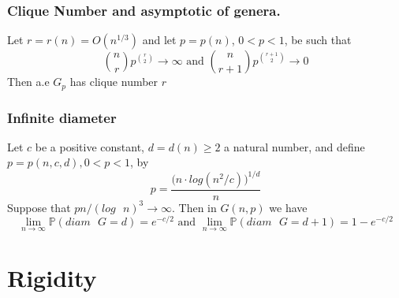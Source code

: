 \documentclass[handout]{beamer}
\theoremstyle{plain}
\renewcommand{\P}{\mathbb{P}}
\begin{document}
\begin{frame}

\frametitle{Clique Number  and asymptotic  of  genera.}
\begin{theorem}
Let $r = r(n) = O(n^{1/3})$ and let $p=p(n)$, $0<p<1$, be such that
$$\binom{n}{r} p^{\binom{r}{2}} \to \infty \text{ and } \binom{n}{r+1} p^{\binom{r+1}{2}} \to 0 $$
Then a.e $G_{p}$ has clique number $r$
\end{theorem}
\end{frame}

\begin{frame}\frametitle{Infinite  diameter}
\begin{theorem}
Let $c$ be a positive constant, $d=d(n)\geq 2$ a natural number, and define $p=p(n,c,d), 0<p<1$, by
$$p = \frac{\big( n\cdot log(n^2/c)\big) ^{1/d}}{n}$$
Suppose that $pn/(log\text{ }n)^{3} \to \infty$. Then in $G(n,p)$ we have
$$\lim_{n\to \infty} \P (diam\text{ }G = d) = e^{-c/2} \text{ and }  \lim_{n\to \infty} \P (diam\text{ }G = d+1) = 1 - e^{-c/2}$$
\end{theorem}
\end{frame}


\section{Rigidity }
\begin{frame}

\end{frame}
\end{document}
